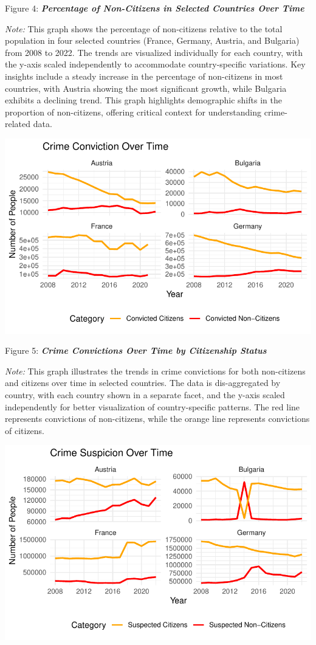 \documentclass[
]{article}
\begin{document}
Figure 4: \textbf{\emph{Percentage of Non-Citizens in Selected Countries
Over Time}}

\emph{Note:} This graph shows the percentage of non-citizens relative to
the total population in four selected countries (France, Germany,
Austria, and Bulgaria) from 2008 to 2022. The trends are visualized
individually for each country, with the y-axis scaled independently to
accommodate country-specific variations. Key insights include a steady
increase in the percentage of non-citizens in most countries, with
Austria showing the most significant growth, while Bulgaria exhibits a
declining trend. This graph highlights demographic shifts in the
proportion of non-citizens, offering critical context for understanding
crime-related data.

\includegraphics{DataMan_Project_files/figure-pdf/unnamed-chunk-28-1.pdf}

Figure 5: \textbf{\emph{Crime Convictions Over Time by Citizenship
Status}}

\emph{Note:} This graph illustrates the trends in crime convictions for
both non-citizens and citizens over time in selected countries. The data
is dis-aggregated by country, with each country shown in a separate
facet, and the y-axis scaled independently for better visualization of
country-specific patterns. The red line represents convictions of
non-citizens, while the orange line represents convictions of citizens.

\includegraphics{DataMan_Project_files/figure-pdf/unnamed-chunk-29-1.pdf}
\end{document}

